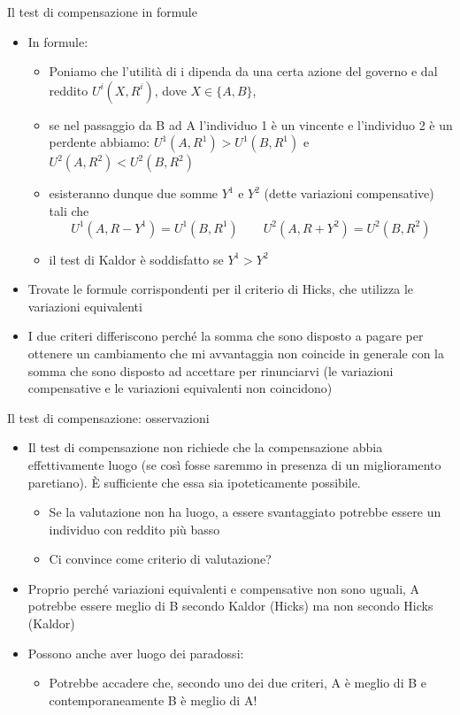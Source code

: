 \documentclass[aspectratio=64,11pt]{beamer}
\begin{document}
\begin{frame}{Il test di compensazione in formule}
\begin{itemize}
\item In formule:
\begin{itemize}
\item Poniamo che l’utilità di i dipenda da una certa azione del governo e dal
reddito $U^i(X, R^i)$, dove $X\in\{A, B\}$,
\item se nel passaggio da B ad A l’individuo 1 è un vincente e l’individuo 2 è
un perdente abbiamo:
$U^1(A, R^1) > U^1(B, R^1)$ e $U^2(A, R^2) < U^2(B, R^2)$
\item esisteranno dunque due somme $Y^1$ e $Y^2$ (dette variazioni compensative) tali che
\begin{equation*}
U^1(A, R - Y^1) = U^1(B, R^1) \qquad U^2(A, R + Y^2) = U^2(B, R^2)
\end{equation*}
\item il test di Kaldor è soddisfatto se $Y^1 >  Y^2$
\end{itemize}
\item Trovate le formule corrispondenti per il criterio di Hicks, che utilizza le
variazioni equivalenti
\item I due criteri differiscono perché la somma che sono disposto a pagare per
ottenere un cambiamento che mi avvantaggia non coincide in generale con la
somma che sono disposto ad accettare per rinunciarvi (le variazioni
compensative e le variazioni equivalenti non coincidono)
\end{itemize}
\end{frame}

\begin{frame}{Il test di compensazione: osservazioni}
\begin{itemize}
\item Il test di compensazione non richiede che la compensazione abbia effettivamente luogo (se così fosse saremmo in presenza di un miglioramento paretiano). È sufficiente che essa sia \alert{ipoteticamente} possibile.
\begin{itemize}
\item Se la valutazione non ha luogo, a essere svantaggiato potrebbe essere un individuo con reddito più basso
\item Ci convince come criterio di valutazione?
\end{itemize}
\item Proprio perché variazioni equivalenti e compensative non sono uguali, A potrebbe essere meglio di B secondo Kaldor (Hicks) ma non secondo Hicks (Kaldor)
\item Possono anche aver luogo dei paradossi: 
\begin{itemize}
\item Potrebbe accadere che, secondo uno dei due criteri, A è meglio di B e contemporaneamente B è meglio di A!
\end{itemize}
\end{itemize}
\end{frame}
\end{document}
